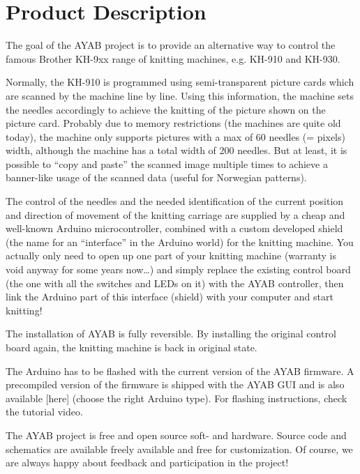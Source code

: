 \documentclass[fleqn,10pt]{SelfArx} %
\begin{document}

\section{Product Description}

The goal of the AYAB project is to provide an alternative way to control the famous Brother KH-9xx range of knitting machines, e.g. KH-910 and KH-930.

Normally, the KH-910 is programmed using semi-transparent picture cards which are scanned by the machine line by line. Using this information, the machine sets the needles accordingly to achieve the knitting of the picture shown on the picture card.
Probably due to memory restrictions (the machines are quite old today), the machine only supports pictures with a max of 60 needles (= pixels) width, although the machine has a total width of 200 needles. But at least, it is possible to “copy and paste” the scanned image multiple times to achieve a banner-like usage of the scanned data (useful for Norwegian patterns).

The control of the needles and the needed identification of the current position and direction of movement of the knitting carriage are supplied by a cheap and well-known Arduino microcontroller, combined with a custom developed shield (the name for an “interface” in the Arduino world) for the knitting machine.
You actually only need to open up one part of your knitting machine (warranty is void anyway for some years now…) and simply replace the existing control board (the one with all the switches and LEDs on it) with the AYAB controller, then link the Arduino part of this interface (shield) with your computer and start knitting!

The installation of AYAB is fully reversible. By installing the original control board again, the knitting machine is back in original state.

The Arduino has to be flashed with the current version of the AYAB firmware. A precompiled version of the firmware is shipped with the AYAB GUI and is also available [here] (choose the right Arduino type). For flashing instructions, check the tutorial video.

The AYAB project is free and open source soft- and hardware. Source code and schematics are available freely available and free for customization. Of course, we are always happy about feedback and participation in the project!
\end{document}
